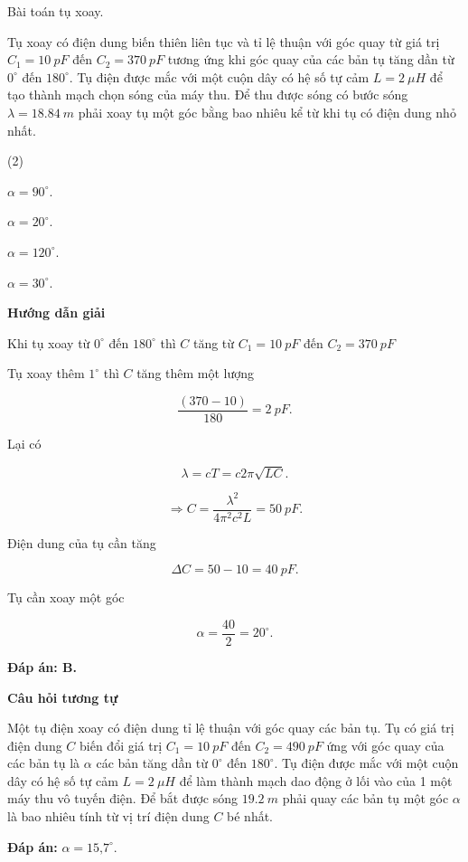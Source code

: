 \begin{dang}{Bài toán tụ xoay.}
{		Tụ xoay có điện dung biến thiên liên tục và tỉ lệ thuận với góc quay từ giá trị $C_1 = \SI{10}{pF}$ đến $C_2 = \SI{370}{pF}$ tương ứng khi góc quay của các bản tụ tăng dần từ $0^\circ$ đến $180^\circ$. Tụ điện được mắc với một cuộn dây có hệ số tự cảm $L = \SI{2}{\mu H}$ để tạo thành mạch chọn sóng của máy thu. Để thu được sóng có bước sóng $\lambda = \SI{18,84}{m}$ phải xoay tụ một góc bằng bao nhiêu kể từ khi tụ có điện dung nhỏ nhất.
		\begin{mcq}(2)
			\item $\alpha = 90^\circ$.             
			\item $\alpha = 20^\circ$.
			\item $\alpha = 120^\circ$.              
			\item $\alpha = 30^\circ$.
		\end{mcq}
		
	}
	{	\begin{center}
			\textbf{Hướng dẫn giải}
		\end{center}
		
		Khi tụ xoay từ $0^\circ$ đến $180^\circ$ thì $C$ tăng từ $C_1 = \SI{10}{pF}$ đến $C_2 = \SI{370}{pF}$
		
		Tụ xoay thêm $1^\circ$ thì $C$ tăng thêm một lượng 
		
		$$\dfrac{(370-10)}{180} = \SI{2}{pF}.$$
		
		Lại có 
		
		$$\lambda = cT = c2 \pi \sqrt{LC}.$$
		
		$$\Rightarrow C = \dfrac{\lambda^2}{4\pi^2 c^2 L} = \SI{50}{pF}.$$
		
		Điện dung của tụ cần tăng 
		
		$$\Delta C = 50 - 10 = \SI{40}{pF}.$$
		
		Tụ cần xoay một góc 
		
		$$\alpha = \dfrac{40}{2} = 20^\circ.$$
		
		\textbf{Đáp án: B.}
		
		\begin{center}
			\textbf{Câu hỏi tương tự}
		\end{center}
		
		Một tụ điện xoay có điện dung tỉ lệ thuận với góc quay các bản tụ. Tụ có giá trị điện dung $C$ biến đổi giá trị $C_1 = \SI{10}{pF}$ đến $C_2 = \SI{490}{pF}$ ứng với góc quay của các bản tụ là $\alpha$ các bản tăng dần từ $0^\circ$ đến $180^\circ$. Tụ điện được mắc với một cuộn dây có hệ số tự cảm $L = \SI{2}{\mu H}$ để làm thành mạch dao động ở lối vào của 1 một máy thu vô tuyến điện. Để bắt được sóng $\SI{19,2}{m}$ phải quay các bản tụ một góc $\alpha$ là bao nhiêu tính từ vị trí điện dung $C$ bé nhất.
		
		\textbf{Đáp án:} $\alpha = \text{15,7}^\circ.$
	}
	
\end{dang}
